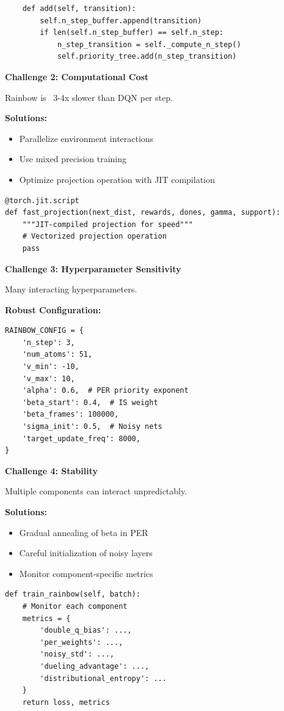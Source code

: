 \documentclass[12pt]{article}
\begin{document}
{{\begin{verbatim}
    def add(self, transition):
        self.n_step_buffer.append(transition)
        if len(self.n_step_buffer) == self.n_step:
            n_step_transition = self._compute_n_step()
            self.priority_tree.add(n_step_transition)
\end{verbatim}

\textbf{Challenge 2: Computational Cost}

Rainbow is ~3-4x slower than DQN per step.

\textbf{Solutions:}
\begin{itemize}
\item Parallelize environment interactions
\item Use mixed precision training
\item Optimize projection operation with JIT compilation
\end{itemize}

\begin{verbatim}
@torch.jit.script
def fast_projection(next_dist, rewards, dones, gamma, support):
    """JIT-compiled projection for speed"""
    # Vectorized projection operation
    pass
\end{verbatim}

\textbf{Challenge 3: Hyperparameter Sensitivity}

Many interacting hyperparameters.

\textbf{Robust Configuration:}
\begin{verbatim}
RAINBOW_CONFIG = {
    'n_step': 3,
    'num_atoms': 51,
    'v_min': -10,
    'v_max': 10,
    'alpha': 0.6,  # PER priority exponent
    'beta_start': 0.4,  # IS weight
    'beta_frames': 100000,
    'sigma_init': 0.5,  # Noisy nets
    'target_update_freq': 8000,
}
\end{verbatim}

\textbf{Challenge 4: Stability}

Multiple components can interact unpredictably.

\textbf{Solutions:}
\begin{itemize}
\item Gradual annealing of beta in PER
\item Careful initialization of noisy layers
\item Monitor component-specific metrics
\end{itemize}

\begin{verbatim}
def train_rainbow(self, batch):
    # Monitor each component
    metrics = {
        'double_q_bias': ...,
        'per_weights': ...,
        'noisy_std': ...,
        'dueling_advantage': ...,
        'distributional_entropy': ...
    }
    return loss, metrics
\end{verbatim}

}}
\end{document}
